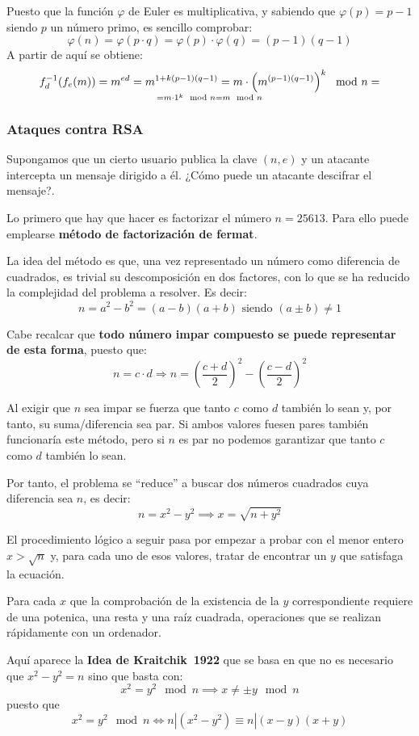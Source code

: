 \documentclass[nochap]{apuntesURJC}
\begin{document}
Puesto que la función $\varphi$ de Euler es multiplicativa, y sabiendo que $\varphi(p)=p-1$ siendo $p$ un número primo, es sencillo comprobar:
\[\varphi(n) = \varphi(p\cdot q) = \varphi(p) \cdot \varphi(q) = (p-1)(q-1)\]
A partir de aquí se obtiene:
\[f_d^{-1}(f_e(m)) = m^{ed} = m^{1+k(p-1)(q-1)} = m \cdot \left(m^{(p-1)(q-1)}\right)^k\mod n = \atop = m \cdot 1^k \mod n = m \mod n\]

\subsubsection{Ataques contra RSA}

Supongamos que un cierto usuario publica la clave $(n,e)$ y un atacante intercepta un mensaje dirigido a él. ¿Cómo puede un atacante descifrar el mensaje?.

Lo primero que hay que hacer es factorizar el número $n=25613$. Para ello puede emplearse \textbf{método de factorización de fermat}.

La idea del método es que, una vez representado un número como diferencia de cuadrados, es trivial su descomposición en dos factores, con lo que se ha reducido la complejidad del problema a resolver. Es decir:
\[n = a^2-b^2 = (a-b)(a+b) \text{ siendo } (a\pm b) \neq 1\]

Cabe recalcar que \textbf{todo número impar compuesto se puede representar de esta forma}, puesto que:
\[n=c\cdot d \Rightarrow n = \left( \frac{c+d}{2}\right)^2 - \left( \frac{c-d}{2}\right)^2\]

Al exigir que $n$ sea impar se fuerza que tanto $c$ como $d$ también lo sean y, por tanto, su suma/diferencia sea par. Si ambos valores fuesen pares también funcionaría este método, pero si $n$ es par no podemos garantizar que tanto $c$ como $d$ también lo sean.

Por tanto, el problema se ``reduce'' a buscar dos números cuadrados cuya diferencia sea $n$, es decir:
\[n=x^2-y^2 \implies x = \sqrt{n+y^2}\]

El procedimiento lógico a seguir pasa por empezar a probar con el menor entero $x>\sqrt{n}$ y, para cada uno de esos valores, tratar de encontrar un $y$ que satisfaga la ecuación.

Para cada $x$ que la comprobación de la existencia de la $y$ correspondiente requiere de una potenica, una resta y una raíz cuadrada, operaciones que se realizan rápidamente con un ordenador.

Aquí aparece la \textbf{Idea de Kraitchik~1922} que se basa en que no es necesario que $x^2-y^2 =n$ sino que basta con:
\[x^2 = y^2 \mod n \implies x \neq \pm y \mod n\]
puesto que
\[x^2 = y^2 \mod n \iff n|(x^2-y^2) \equiv n|(x-y)(x+y)\]
\end{document}

